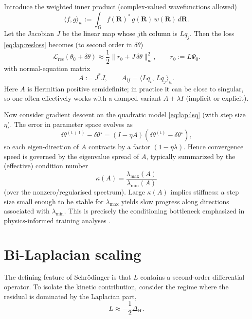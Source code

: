 Introduce the weighted inner product (complex-valued wavefunctions allowed)
\begin{equation}
\langle f,g\rangle_w := \int_\Omega f(\mathbf R)^\ast\,g(\mathbf R)\,w(\mathbf R)\,d\mathbf R.
\end{equation}
Let the Jacobian $J$ be the linear map whose $j$th column is $Lq_j$.
Then the loss \eqref{eq:lap:resloss} becomes (to second order in $\delta\theta$)
\begin{equation}
\mathcal L_{\mathrm{res}}(\theta_0+\delta\theta)
\approx
\frac12\|r_0 + J\,\delta\theta\|_w^2,
\qquad
r_0 := L\Psi_0.
\label{eq:lap:lsq}
\end{equation}
with normal-equation matrix
\begin{equation}
A := J^\ast J,
\qquad
A_{ij}=\langle Lq_i,\,Lq_j\rangle_w.
\label{eq:lap:Adef}
\end{equation}
Here $A$ is Hermitian positive semidefinite; in practice it can be close to singular,
so one often effectively works with a damped variant $A+\lambda I$ (implicit or explicit).

Now consider gradient descent on the quadratic model \eqref{eq:lap:lsq}
(with step size $\eta$). The error in parameter space evolves as
\begin{equation}
\delta\theta^{(t+1)}-\delta\theta^\star
=
\left(I-\eta A\right)\left(\delta\theta^{(t)}-\delta\theta^\star\right),
\label{eq:lap:GD}
\end{equation}
so each eigen-direction of $A$ contracts by a factor $(1-\eta\lambda)$.
Hence convergence speed is governed by the eigenvalue spread of $A$,
typically summarized by the (effective) condition number
\begin{equation}
\kappa(A)=\frac{\lambda_{\max}(A)}{\lambda_{\min}(A)}
\end{equation}
(over the nonzero/regularised spectrum).
Large $\kappa(A)$ implies stiffness: a step size small enough to be stable for
$\lambda_{\max}$ yields slow progress along directions associated with
$\lambda_{\min}$. This is precisely the conditioning bottleneck emphasized in
physics-informed training analyses \cite{De_Ryck_2024}.

\section{Bi-Laplacian scaling}
\label{app:laplacian:bilap}

The defining feature of Schr\"odinger is that $L$ contains a second-order
differential operator. To isolate the kinetic contribution, consider the regime
where the residual is dominated by the Laplacian part,
\begin{equation}
L \approx -\frac12\Delta_{\mathbf R}.
\label{eq:lap:Lapprox}
\end{equation}


